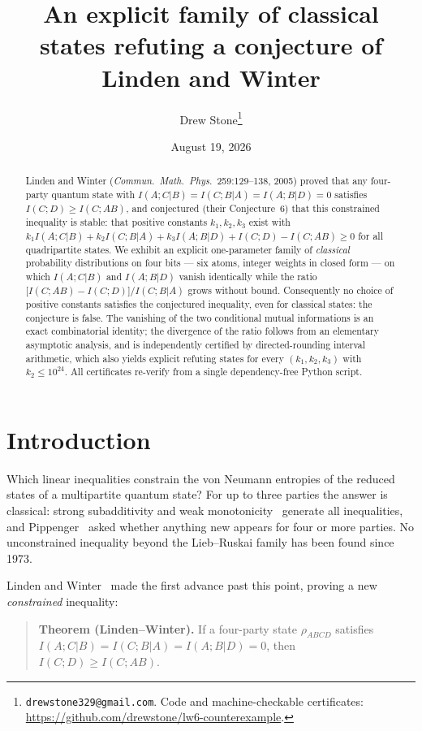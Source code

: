\documentclass[11pt]{article}
\title{An explicit family of classical states refuting a conjecture of Linden and Winter}
\author{Drew Stone\thanks{\texttt{drewstone329@gmail.com}. Code and machine-checkable
certificates: \url{https://github.com/drewstone/lw6-counterexample}.}}
\date{August 19, 2026}
\theoremstyle{remark}
\newcommand{\I}{\mathrel{;}}
\begin{document}
\maketitle

\begin{abstract}
Linden and Winter (\emph{Commun.\ Math.\ Phys.}\ 259:129--138, 2005) proved that any
four-party quantum state with $I(A\I C|B)=I(C\I B|A)=I(A\I B|D)=0$ satisfies
$I(C\I D)\ge I(C\I AB)$, and conjectured (their Conjecture~6) that this constrained
inequality is stable: that positive constants $k_1,k_2,k_3$ exist with
$k_1 I(A\I C|B)+k_2 I(C\I B|A)+k_3 I(A\I B|D)+I(C\I D)-I(C\I AB)\ge 0$
for all quadripartite states. We exhibit an explicit one-parameter family of
\emph{classical} probability distributions on four bits --- six atoms, integer weights in
closed form --- on which $I(A\I C|B)$ and $I(A\I B|D)$ vanish identically while the ratio
$\bigl[I(C\I AB)-I(C\I D)\bigr]/I(C\I B|A)$ grows without bound. Consequently no choice of
positive constants satisfies the conjectured inequality, even for classical states: the
conjecture is false. The vanishing of the two conditional mutual informations is an exact
combinatorial identity; the divergence of the ratio follows from an elementary asymptotic
analysis, and is independently certified by directed-rounding interval arithmetic, which
also yields explicit refuting states for every $(k_1,k_2,k_3)$ with
$k_2\le 10^{24}$. All certificates re-verify from a single dependency-free Python script.
\end{abstract}

\section{Introduction}

Which linear inequalities constrain the von Neumann entropies of the reduced states of a
multipartite quantum state? For up to three parties the answer is classical: strong
subadditivity and weak monotonicity~\cite{LiebRuskai1973} generate all inequalities, and
Pippenger~\cite{Pippenger2003} asked whether anything new appears for four or more
parties. No unconstrained inequality beyond the Lieb--Ruskai family has been found since
1973.

Linden and Winter~\cite{LindenWinter2005} made the first advance past this point,
proving a new \emph{constrained} inequality:

\begin{quote}
\textbf{Theorem (Linden--Winter).} If a four-party state $\rho_{ABCD}$ satisfies
$I(A\I C|B)=I(C\I B|A)=I(A\I B|D)=0$, then $I(C\I D)\ge I(C\I AB)$.
\end{quote}
\end{document}
